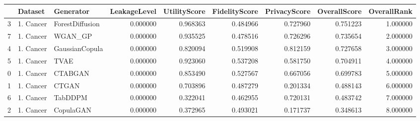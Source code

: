 \begin{tabular}{lllrrrrrr}
\toprule
 & Dataset & Generator & LeakageLevel & UtilityScore & FidelityScore & PrivacyScore & OverallScore & OverallRank \\
\midrule
3 & 1. Cancer & ForestDiffusion & 0.000000 & 0.968363 & 0.484966 & 0.727960 & 0.751223 & 1.000000 \\
7 & 1. Cancer & WGAN_GP & 0.000000 & 0.935525 & 0.478516 & 0.726296 & 0.735654 & 2.000000 \\
4 & 1. Cancer & GaussianCopula & 0.000000 & 0.820094 & 0.519908 & 0.812159 & 0.727658 & 3.000000 \\
5 & 1. Cancer & TVAE & 0.000000 & 0.923060 & 0.537208 & 0.581750 & 0.704911 & 4.000000 \\
0 & 1. Cancer & CTABGAN & 0.000000 & 0.853490 & 0.527567 & 0.667056 & 0.699783 & 5.000000 \\
1 & 1. Cancer & CTGAN & 0.000000 & 0.703896 & 0.487279 & 0.201334 & 0.488143 & 6.000000 \\
6 & 1. Cancer & TabDDPM & 0.000000 & 0.322041 & 0.462955 & 0.720131 & 0.483742 & 7.000000 \\
2 & 1. Cancer & CopulaGAN & 0.000000 & 0.372965 & 0.493021 & 0.171737 & 0.348613 & 8.000000 \\
\bottomrule
\end{tabular}
